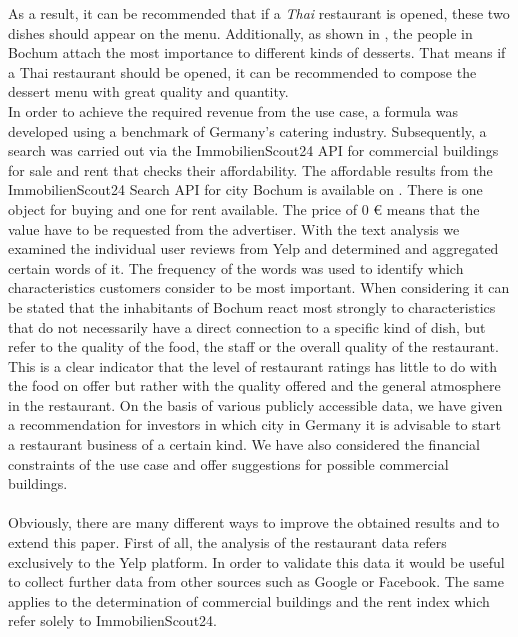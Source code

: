 As a result, it can be recommended that if a \textit{Thai} restaurant is opened, these two dishes should appear on the menu. Additionally, as shown in , the people in Bochum attach the most importance to different kinds of desserts. That means if a Thai restaurant should be opened, it can be recommended to compose the dessert menu with great quality and quantity.\\
In order to achieve the required revenue from the use case, a formula was developed using a benchmark of Germany's catering industry. Subsequently, a search was carried out via the ImmobilienScout24 \ac{API} for commercial buildings for sale and rent that checks their affordability. The affordable results from the ImmobilienScout24 Search \ac{API} for city Bochum is available on . There is one object for buying and one for rent available. The price of 0 \euro{} means that the value have to be requested from the advertiser.\newline
With the text analysis we examined the individual user reviews from Yelp and determined and aggregated certain words of it. The frequency of the words was used to identify which characteristics customers consider to be most important.\newline
When considering  it can be stated that the inhabitants of Bochum react most strongly to characteristics that do not necessarily have a direct connection to a specific kind of dish, but refer to the quality of the food, the staff or the overall quality of the restaurant. This is a clear indicator that the level of restaurant ratings has little to do with the food on offer but rather with the quality offered and the general atmosphere in the restaurant.
On the basis of various publicly accessible data, we have given a recommendation for investors in which city in Germany it is advisable to start a restaurant business of a certain kind. We have also considered the financial constraints of the use case and offer suggestions for possible commercial buildings.
\\\\
Obviously, there are many different ways to improve the obtained results and to extend this paper. First of all, the analysis of the restaurant data refers exclusively to the Yelp platform. In order to validate this data it would be useful to collect further data from other sources such as Google or Facebook. The same applies to the determination of commercial buildings and the rent index which refer solely to ImmobilienScout24. \newline
